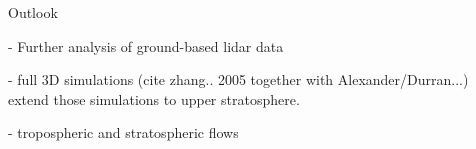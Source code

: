 


Outlook

- Further analysis of ground-based lidar data

- full 3D simulations (cite zhang.. 2005 together with Alexander/Durran...) extend those simulations to upper stratosphere.

- tropospheric and stratospheric flows

